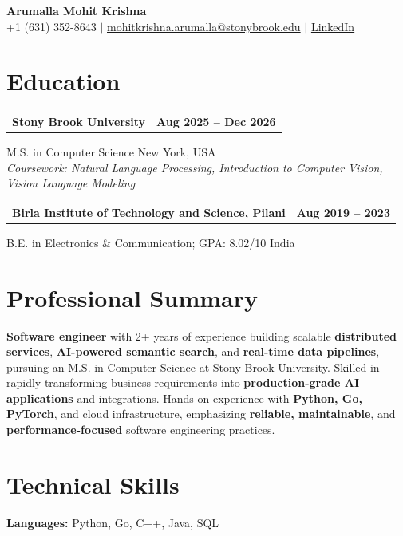 \documentclass[letterpaper,10pt]{article}
\makeatletter
\newcommand{\entry}[2]{%
  \noindent
  \begin{tabularx}{\linewidth}
    {@{}>{\raggedright\arraybackslash}X@{\hspace{6pt}}r@{}}
    \textbf{#1} & #2
  \end{tabularx}\par
}
\makeatother
\begin{document}
\begin{center}
    {\LARGE\bfseries Arumalla Mohit Krishna}\\[3pt]
    +1 (631) 352-8643 $|$
    \href{mailto:mohitkrishna.arumalla@stonybrook.edu}
    {mohitkrishna.arumalla@stonybrook.edu} $|$
    \href{https://linkedin.com/in/mohit-krishna-arumalla}
    {LinkedIn}
\end{center}
\vspace{-8pt}

\section{Education}

\entry
  {\textbf{Stony Brook University}}
  {\textbf{Aug 2025 -- Dec 2026}}

M.S. in Computer Science \hfill New York, USA\\
\textit{
Coursework: Natural Language Processing,
Introduction to Computer Vision, Vision Language Modeling
}
\vspace{3pt}

\entry
  {\textbf{Birla Institute of Technology and Science, Pilani}}
  {\textbf{Aug 2019 -- 2023}}

B.E. in Electronics \& Communication; GPA: 8.02/10 \hfill India
\section{Professional Summary}

\textbf{Software engineer} with 2+ years of experience building scalable \textbf{distributed services}, \textbf{AI-powered semantic search}, and \textbf{real-time data pipelines}, pursuing an M.S. in Computer Science at Stony Brook University. Skilled in rapidly transforming business requirements into \textbf{production-grade AI applications} and integrations. Hands-on experience with \textbf{Python, Go, PyTorch}, and cloud infrastructure, emphasizing \textbf{reliable, maintainable}, and \textbf{performance-focused} software engineering practices.
\section{Technical Skills}

\textbf{Languages:}
Python, Go, C++, Java, SQL\\
\end{document}
